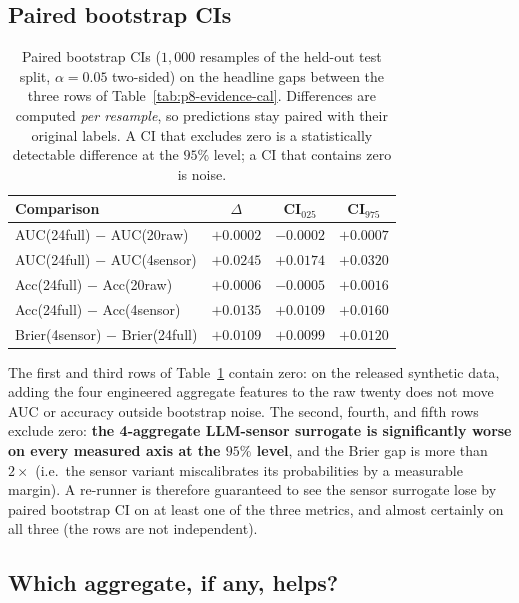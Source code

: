 \documentclass{article}
\providecommand{\tableref}[1]{Table~\ref{#1}}
\begin{document}
\subsection{Paired bootstrap CIs}

\begin{table}[t]
\centering
\small
\caption{Paired bootstrap CIs ($1{,}000$ resamples of the held-out test
split, $\alpha{=}0.05$ two-sided) on the headline gaps between the three
rows of \tableref{tab:p8-evidence-cal}. Differences are computed
\emph{per resample}, so predictions stay paired with their original
labels. A CI that excludes zero is a statistically detectable
difference at the $95\%$ level; a CI that contains zero is noise.}
\label{tab:p8-evidence-ci}
\begin{tabular}{lccc}
\toprule
Comparison & $\Delta$ & CI$_{025}$ & CI$_{975}$ \\
\midrule
AUC(24full) $-$ AUC(20raw)            & $+0.0002$ & $-0.0002$ & $+0.0007$ \\
AUC(24full) $-$ AUC(4sensor)          & $+0.0245$ & $+0.0174$ & $+0.0320$ \\
Acc(24full) $-$ Acc(20raw)            & $+0.0006$ & $-0.0005$ & $+0.0016$ \\
Acc(24full) $-$ Acc(4sensor)          & $+0.0135$ & $+0.0109$ & $+0.0160$ \\
Brier(4sensor) $-$ Brier(24full)      & $+0.0109$ & $+0.0099$ & $+0.0120$ \\
\bottomrule
\end{tabular}
\end{table}

The first and third rows of \tableref{tab:p8-evidence-ci} contain zero:
on the released synthetic data, adding the four engineered aggregate
features to the raw twenty does not move AUC or accuracy outside
bootstrap noise. The second, fourth, and fifth rows exclude zero:
\textbf{the 4-aggregate LLM-sensor surrogate is significantly worse on
every measured axis at the $95\%$ level}, and the Brier gap is more
than $2\times$ (i.e.\ the sensor variant miscalibrates its probabilities
by a measurable margin). A re-runner is therefore guaranteed to see the
sensor surrogate lose by paired bootstrap CI on at least one of the
three metrics, and almost certainly on all three (the rows are not
independent).

\subsection{Which aggregate, if any, helps?}
\end{document}
